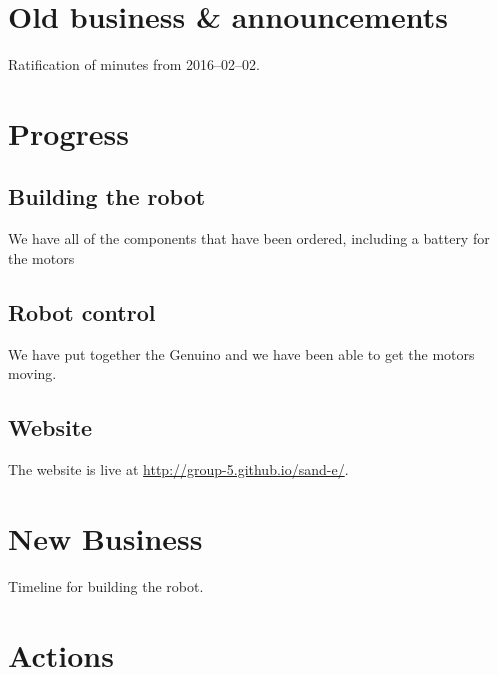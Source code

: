 \documentclass[a4paper,11pt,twoside,class=meetingmins,crop=false,agenda]{standalone}
\begin{document}

\maketitle

\section{Old business \& announcements}
\begin{items}
    \item Ratification of minutes from 2016--02--02.
\end{items}


\section{Progress}
\begin{items}
    \subsection{Building the robot}
        \item We have all of the components that have been ordered, including a battery for the motors

    \subsection{Robot control}
        \item We have put together the Genuino and we have been able to get the motors moving.

    \subsection{Website}
        \item The website is live at \url{http://group-5.github.io/sand-e/}.

\end{items}

\section{New Business}
\begin{items}
    \item Timeline for building the robot.
\end{items}

\vspace{1em}
\vspace{1em}

\section{Actions}
\begin{items}
    \action{}{}
\end{items}
\end{document}
